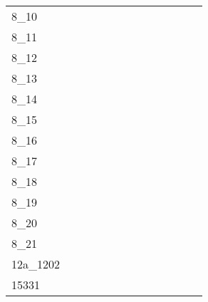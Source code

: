 \begin{longtable}{lcccccccccccc}
8\_10 &  &  &  &  &  &  &  &  &  &  &  &  \\
8\_11 &  &  &  &  &  &  &  &  &  &  &  &  \\
8\_12 &  &  &  &  &  &  &  &  &  &  &  &  \\
8\_13 &  &  &  &  &  &  &  &  &  &  &  &  \\
8\_14 &  &  &  &  &  &  &  &  &  &  &  &  \\
8\_15 &  &  &  &  &  &  &  &  &  &  &  &  \\
8\_16 &  &  &  &  &  &  &  &  &  &  &  &  \\
8\_17 &  &  &  &  &  &  &  &  &  &  &  &  \\
8\_18 &  &  &  &  &  &  &  &  &  &  &  &  \\
8\_19 &  &  &  &  &  &  &  &  &  &  &  &  \\
8\_20 &  &  &  &  &  &  &  &  &  &  &  &  \\
8\_21 &  &  &  &  &  &  &  &  &  &  &  &  \\
12a\_1202 &  &  &  &  &  &  &  &  &  &  &  &  \\
15331 &  &  &  &  &  &  &  &  &  &  &  &  \\
\bottomrule
\end{longtable}
